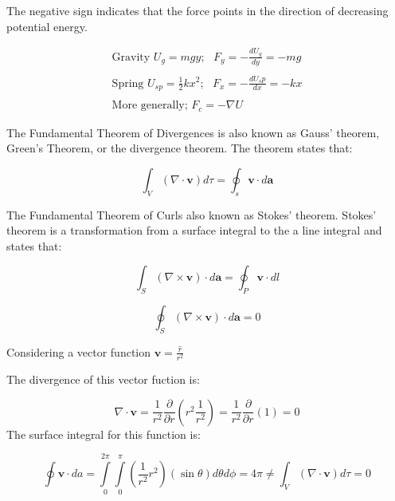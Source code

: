 The negative sign indicates that the force points in the direction of decreasing potential energy.


\begin{equation}
\begin{gathered}
\text{Gravity } U_g = mgy; \ \ \ F_y = - \frac{dU_g}{dy} = -mg \\\\
\text{Spring \ } U_{sp}=\frac{1}{2}kx^2; \ \ \ F_x = - \frac{dU_sp}{dx} = -kx\\\\
\text{More generally; \ }  F_c = -\nabla{U}
\end{gathered} 
\end{equation}

The Fundamental Theorem of Divergences is also known as Gauss' theorem, Green's Theorem, or the divergence theorem. The theorem states that:


\begin{equation}
\int_V (\nabla{} \cdot \mathbf{v})d\tau = \oint_s \mathbf{v}\cdot d\mathbf{a}
\end{equation}

The Fundamental Theorem of Curls also known as Stokes' theorem. Stokes' theorem is a transformation from a surface integral to the a line integral and states that:


\begin{equation}
\int_S (\nabla \times\mathbf{v})\cdot d\mathbf{a}  = \oint_P \mathbf{v} \cdot dl
\end{equation}


\begin{equation}
\oint_S (\nabla \times\mathbf{v})\cdot d\mathbf{a} = 0
\end{equation}

\newpage

Considering a vector function \( \mathbf{v} = \frac{\hat{r}}{r^2} \)

The divergence of this vector fuction is:

\begin{equation}
\nabla{} \cdot \mathbf{v} = \frac{1}{r^2}\frac{\partial{}}{\partial{r}} (r^2\frac{1}{r^2})  =  \frac{1}{r^2}\frac{\partial{}}{\partial{r}} (1) = 0
\end{equation}
The surface integral for this function is:


\begin{equation}
\oint \mathbf{v} \cdot da = \int\limits_{0}^{2\pi}\int\limits_{0}^{\pi}(\frac{1}{r^2}r^2)(\sin{\theta}) d\theta d\phi = 4\pi \neq  \int_V (\nabla{} \cdot \mathbf{v})d\tau = 0
\end{equation}

